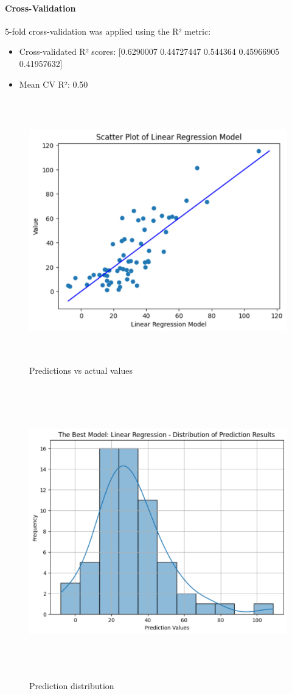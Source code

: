 \documentclass[12pt,a4paper]{report}
\begin{document}
\paragraph{Cross-Validation}
5-fold cross-validation was applied using the R² metric:
\begin{itemize}
    \item Cross-validated R² scores: [0.6290007  0.44727447 0.544364   0.45966905 0.41957632]
    \item Mean CV R²: 0.50
\end{itemize}

\begin{figure}[H]
    \centering
    \includegraphics[width=6in,height=4.5in]{media/image5.png}
    \caption{Predictions vs actual values}
\end{figure}

\begin{figure}[H]
    \centering
    \includegraphics[width=6.5in,height=5in]{media/image1.png}
    \caption{Prediction distribution}
\end{figure}
\end{document}
